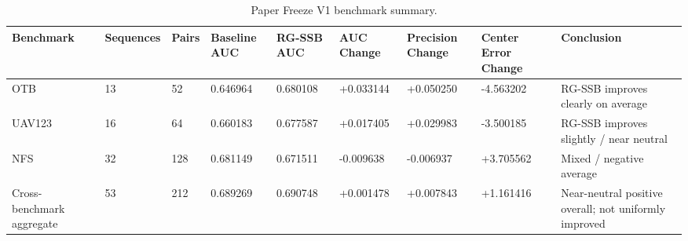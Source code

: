 \begin{table}[t]
\centering
\caption{Paper Freeze V1 benchmark summary.}
\label{tab:paper-freeze-benchmark}
\begin{tabular}{lllllllll}
\toprule
Benchmark & Sequences & Pairs & Baseline AUC & RG-SSB AUC & AUC Change & Precision Change & Center Error Change & Conclusion \\
\midrule
OTB & 13 & 52 & 0.646964 & 0.680108 & +0.033144 & +0.050250 & -4.563202 & RG-SSB improves clearly on average \\
UAV123 & 16 & 64 & 0.660183 & 0.677587 & +0.017405 & +0.029983 & -3.500185 & RG-SSB improves slightly / near neutral \\
NFS & 32 & 128 & 0.681149 & 0.671511 & -0.009638 & -0.006937 & +3.705562 & Mixed / negative average \\
Cross-benchmark aggregate & 53 & 212 & 0.689269 & 0.690748 & +0.001478 & +0.007843 & +1.161416 & Near-neutral positive overall; not uniformly improved \\
\bottomrule
\end{tabular}
\end{table}
